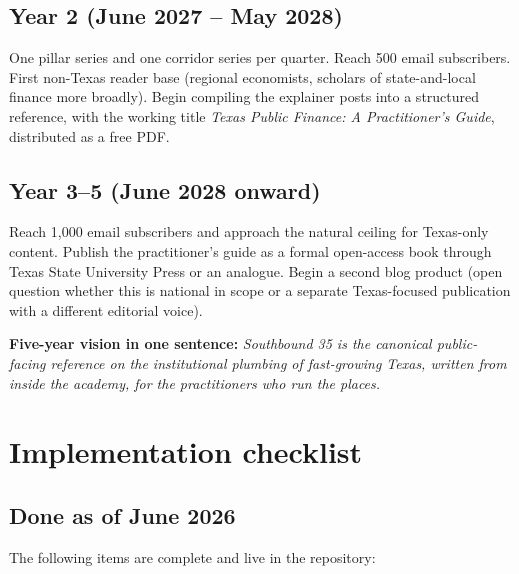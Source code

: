 \documentclass[11pt]{article}
\begin{document}
\subsection{Year 2 (June 2027 -- May 2028)}

One pillar series and one corridor series per quarter. Reach
500 email subscribers. First non-Texas reader base (regional
economists, scholars of state-and-local finance more broadly).
Begin compiling the explainer posts into a structured
reference, with the working title \emph{Texas Public Finance:
A Practitioner's Guide}, distributed as a free PDF.

\subsection{Year 3--5 (June 2028 onward)}

Reach 1{,}000 email subscribers and approach the natural ceiling
for Texas-only content. Publish the practitioner's guide as a
formal open-access book through Texas State University Press or
an analogue. Begin a second blog product (open question whether
this is national in scope or a separate Texas-focused publication
with a different editorial voice).

\textbf{Five-year vision in one sentence:} \emph{Southbound 35 is
the canonical public-facing reference on the institutional plumbing
of fast-growing Texas, written from inside the academy, for the
practitioners who run the places.}

\section{Implementation checklist}

\subsection{Done as of June 2026}

The following items are complete and live in the repository:
\end{document}

